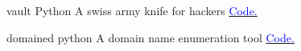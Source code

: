     {vault}
    {}
    {\scriptsize Python}
    {}
    {
        A swiss army knife for hackers
        \hfill
        \href{https://github.com/abhisharma404/vault}{\textcolor{blue}{\scriptsize Code.}}
    }
    \vspace*{0.2\baselineskip}

    {domained}
    {}
    {\scriptsize python}
    {}
    {
        A domain name enumeration tool
        \hfill
        \href{https://github.com/TypeError/domained}{\textcolor{blue}{\scriptsize Code.}}
    }
    \vspace*{0.2\baselineskip}
